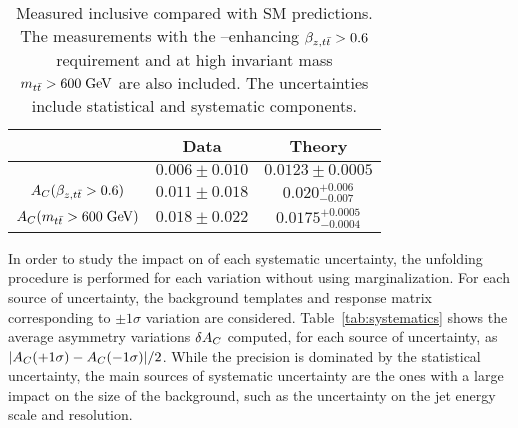 \begin{table}[!htb]\centering
\begin{tabular}{c c c}
\toprule
  & Data & Theory\\
\midrule
 \ac{}                                     & $0.006\pm0.010$ & $0.0123\pm0.0005$ \\
 $A_C{}(\beta_{z,t\bar{t}}>0.6)$   & $0.011\pm0.018$ & $0.020^{+0.006}_{-0.007}$\\
 $A_C{}(m_{t\bar{t}}{} > 600 \; \mathrm{GeV}{})$ & $0.018\pm0.022$ & $0.0175^{+0.0005}_{-0.0004}$\\
\bottomrule
\end{tabular}
\caption{Measured inclusive \ac{} compared with SM
  predictions. The measurements with the \qqbar{}--enhancing
  $\beta_{z,t\bar{t}} > 0.6$ requirement and at high \ttbar{} invariant
  mass $m_{t\bar{t}}{} > 600 \; \mathrm{GeV}{}$ are also included. The uncertainties
  include statistical and systematic components.}
\label{tab:results}
\end{table}

In order to study the impact on \ac{} of each systematic uncertainty,
the unfolding procedure is performed for each variation without using
marginalization. 
For each source of uncertainty, the background templates and
response matrix corresponding to $\pm1\sigma$ variation are
considered. 
Table~\ref{tab:systematics} shows the average asymmetry variations
$\delta A_C{}$ computed, for each source of uncertainty, as
$|A_C{}(+1\sigma)-A_C{}(-1\sigma)|/2$. 
While the precision is dominated by the statistical uncertainty, the main
sources of systematic uncertainty are the ones with a large
impact on the size of the \wjets{} background, such as the
uncertainty on the jet energy scale and resolution. 

